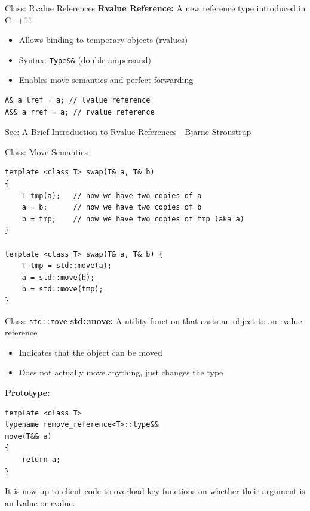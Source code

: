 \begin{frame}[fragile]{Class: Rvalue References}
	\textbf{Rvalue Reference:} A new reference type introduced in C++11
	\begin{itemize}
		\item Allows binding to temporary objects (rvalues)
		\item Syntax: \texttt{Type\&\&} (double ampersand)
		\item Enables move semantics and perfect forwarding
	\end{itemize}

	\begin{verbatim}
A& a_lref = a; // lvalue reference
A&& a_rref = a; // rvalue reference
	\end{verbatim}

	See: \textcolor{blue}{\href{https://www.open-std.org/jtc1/sc22/wg21/docs/papers/2006/n2027.html}{A Brief Introduction to Rvalue References - Bjarne Stroustrup}}
\end{frame}

\begin{frame}[fragile]{Class: Move Semantics}
	\begin{verbatim}
template <class T> swap(T& a, T& b)
{
    T tmp(a);   // now we have two copies of a
    a = b;      // now we have two copies of b
    b = tmp;    // now we have two copies of tmp (aka a)
}

template <class T> swap(T& a, T& b) {
    T tmp = std::move(a);
    a = std::move(b);
    b = std::move(tmp);
}
    \end{verbatim}
\end{frame}

\begin{frame}[fragile]{Class: \texttt{std::move}}
	\textbf{std::move:} A utility function that casts an object to an rvalue reference
	\begin{itemize}
		\item Indicates that the object can be moved
		\item Does not actually move anything, just changes the type
	\end{itemize}

	\textbf{Prototype:}
	\begin{verbatim}
template <class T>
typename remove_reference<T>::type&&
move(T&& a)
{
    return a;
}
    \end{verbatim}
	It is now up to client code to overload key functions on whether their argument is an lvalue or rvalue.
\end{frame}

